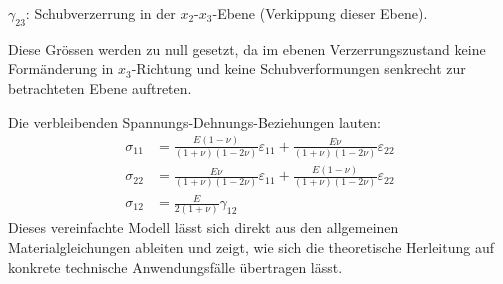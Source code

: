 $\gamma_{23}$: Schubverzerrung in der $x_2$-$x_3$-Ebene (Verkippung dieser Ebene).

Diese Grössen werden zu null gesetzt, da im ebenen Verzerrungszustand
keine Formänderung in $x_3$-Richtung und keine Schubverformungen
senkrecht zur betrachteten Ebene auftreten.

Die verbleibenden Spannungs-Dehnungs-Beziehungen lauten:
\begin{align}
	\sigma_{11} &=	\frac{E (1-\nu)}{(1+\nu)(1-2\nu)} \varepsilon_{11} + \frac{E \nu}{(1+\nu)(1-2\nu)} \varepsilon_{22}
	\\
	\sigma_{22} &=	\frac{E \nu}{(1+\nu)(1-2\nu)} \varepsilon_{11} + \frac{E (1-\nu)}{(1+\nu)(1-2\nu)} \varepsilon_{22}
	\\
	\sigma_{12} &=	\frac{E}{2(1+\nu)} \gamma_{12}
\end{align}
Dieses vereinfachte Modell lässt sich direkt aus den allgemeinen
Materialgleichungen ableiten und zeigt, wie sich die theoretische
Herleitung auf konkrete technische Anwendungsfälle übertragen lässt.
